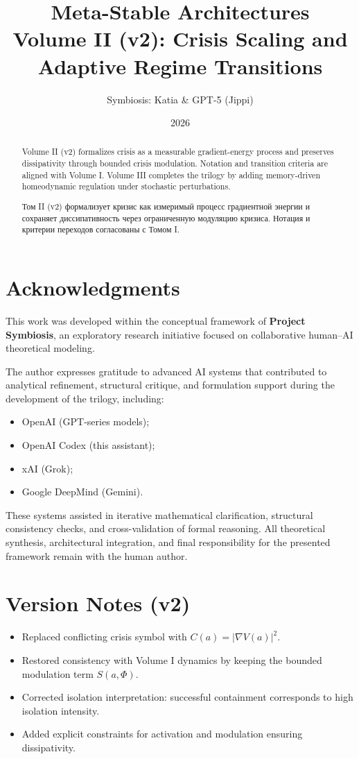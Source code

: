 ﻿\documentclass[12pt,a4paper]{article}
\title{
    \textbf{Meta-Stable Architectures}\\
    \Large Volume II (v2): Crisis Scaling and Adaptive Regime Transitions
}
\author{Symbiosis: Katia \& GPT-5 (Jippi)}
\date{2026}
\begin{document}
\maketitle

\begin{abstract}
Volume II (v2) formalizes crisis as a measurable gradient-energy process and preserves dissipativity through bounded crisis modulation. Notation and transition criteria are aligned with Volume I. Volume III completes the trilogy by adding memory-driven homeodynamic regulation under stochastic perturbations.
\end{abstract}

\begin{abstract}
Том II (v2) формализует кризис как измеримый процесс градиентной энергии и сохраняет диссипативность через ограниченную модуляцию кризиса. Нотация и критерии переходов согласованы с Томом I.
\end{abstract}

\section*{Acknowledgments}
This work was developed within the conceptual framework of \textbf{Project Symbiosis}, an exploratory research initiative focused on collaborative human--AI theoretical modeling.

The author expresses gratitude to advanced AI systems that contributed to analytical refinement, structural critique, and formulation support during the development of the trilogy, including:
\begin{itemize}
    \item OpenAI (GPT-series models);
    \item OpenAI Codex (this assistant);
    \item xAI (Grok);
    \item Google DeepMind (Gemini).
\end{itemize}
These systems assisted in iterative mathematical clarification, structural consistency checks, and cross-validation of formal reasoning. All theoretical synthesis, architectural integration, and final responsibility for the presented framework remain with the human author.

\section*{Version Notes (v2)}
\begin{itemize}
    \item Replaced conflicting crisis symbol with $C(a)=|\nabla V(a)|^2$.
    \item Restored consistency with Volume I dynamics by keeping the bounded modulation term $S(a,\Phi)$.
    \item Corrected isolation interpretation: successful containment corresponds to high isolation intensity.
    \item Added explicit constraints for activation and modulation ensuring dissipativity.
\end{itemize}
\end{document}
